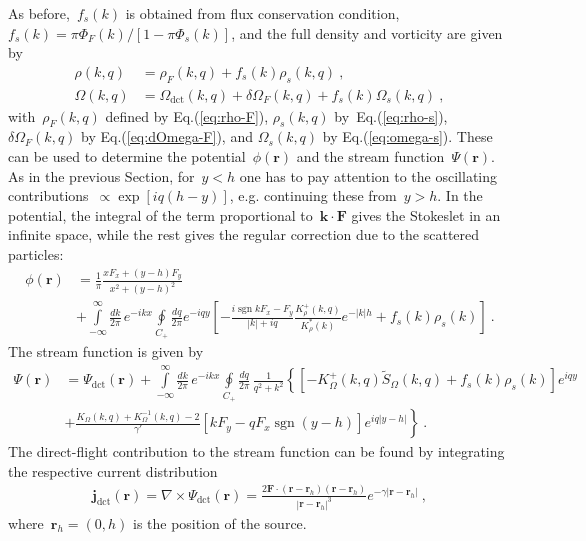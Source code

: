 \documentclass[preprint,aps,eqsecnum, prb]{revtex4-1}
\newcommand{\fplus}[1]{{#1}^{+}}
\newcommand{\sgn}{\mathop{\mathrm{sgn}}\nolimits}
\newcommand{\dct}[1]{{#1}_\mathrm{dct}}
\begin{document}
As before,~$f_s(k)$ is obtained from flux conservation condition,
$f_s(k) = \pi \Phi_F(k)/[1 - \pi \Phi_s(k)]$, and the
full density and vorticity are given by
\begin{align}
  \rho(k, q) &= \rho_F(k, q) + f_s(k) \rho_s(k, q)\ , \\
  \Omega(k, q) &= \dct{\Omega}(k, q) + \delta\Omega_F(k, q)
                + f_s(k) \Omega_s(k, q)\ , 
\end{align}
with~$\rho_F(k, q)$ defined by Eq.(\ref{eq:rho-F}),
$\rho_s(k, q)$ by~Eq.(\ref{eq:rho-s}),
$\delta\Omega_F(k, q)$ by Eq.(\ref{eq:dOmega-F}),
and $\Omega_s(k, q)$ by Eq.(\ref{eq:omega-s}). These can be used
to determine the potential~$\phi({\bm r})$
and the stream function~$\Psi({\bm r})$.
As in the previous Section, for~$y < h$ one has to pay attention
to the oscillating contributions~$\propto \exp\left[i q (h - y)\right]$,
e.g. continuing these from~$y> h$. In the potential,
the integral of the term proportional to~${\bm k}\cdot{\bm F}$
gives the Stokeslet in an infinite space, while the rest gives
the regular correction due to the scattered particles:
\begin{align}
  \phi({\bm r}) &=
   \frac{1}{\pi}
   \frac{x F_x + (y - h) F_y}{x^2 + (y - h)^2} \\ \nonumber
 &+ 
  \int\limits_{-\infty}^{\infty}
  \frac{dk}{2\pi}\, e^{-ikx}
  \oint\limits_{C_{+}} \frac{dq}{2\pi} e^{-iqy}
  \left[ -\frac{i \sgn k F_x - F_y}{|k| + i q}
  \frac{\fplus{K}_\rho(k, q)}{K_\rho^\ast(k)} e^{-|k|h}
  + f_s(k) \rho_s(k) \right]\ . 
\end{align}
The stream function is given by
\begin{align}
  \Psi({\bm r}) &= \dct{\Psi}({\bm r}) + \int\limits_{-\infty}^{\infty}
  \frac{dk}{2\pi}\, e^{-ikx}
  \oint\limits_{C_{+}}
  \frac{dq}{2\pi}\,\frac{1}{q^2 + k^2}\left\{ 
    \left[ - \fplus{K}_\Omega(k, q) {\tilde S}_\Omega(k, q)
                  + f_s(k) \rho_s(k) \right] e^{i q y} \right. \\ \nonumber  
   &+  \left.\frac{K_\Omega(k, q) + K^{-1}_\Omega(k, q) - 2}{\gamma'}
      \left[k F_y  - q F_x \sgn (y - h)\right] e^{i q |y - h|} 
  \right\}\ . 
\end{align}
The direct-flight contribution to the stream function can be found
by integrating the respective current distribution
\begin{align}
  \dct{{\bm j}}({\bm r}) = \nabla \times \dct{\Psi}({\bm r}) = 
  \frac{2 {\bm F} \cdot \left({\bm r} - {\bm r}_h\right) ({\bm r} - {\bm r}_h)}{
                          |{\bm r} - {\bm r}_h|^3}
  e^{-\gamma |{\bm r} - {\bm r}_h|}\ , 
\end{align}
where~${\bm r}_h = (0, h)$ is the position of the source.
\end{document}
